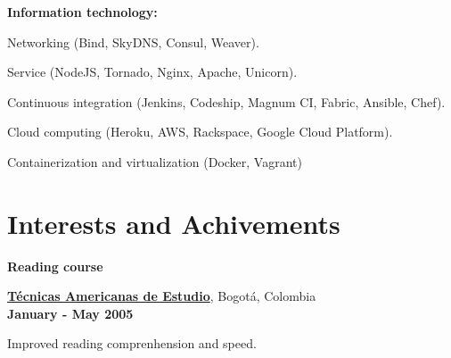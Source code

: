 \halfblankline

\textbf{Information technology:} 
    \begin{innerlist}
\item Networking (Bind, SkyDNS, Consul, Weaver).
\item Service (NodeJS, Tornado, Nginx, Apache, Unicorn).
\item Continuous integration (Jenkins, Codeship, Magnum CI,
Fabric, Ansible, Chef).
\item Cloud computing (Heroku, AWS, Rackspace, Google Cloud Platform).
\item Containerization and virtualization (Docker, Vagrant)
    \end{innerlist}

% 
% 
% 


%
% 
% 

% 

\section{Interests and Achivements}
%
\textbf{Reading course}
\begin{outerlist}

\item[] \href{http://www.tecnicasamericanas.com/}{\textbf{T\'ecnicas Americanas
de Estudio}}, Bogot\'a, Colombia%
        \\ \textbf{January - May 2005}
\begin{innerlist}
\item Improved reading comprenhension and speed.
\end{innerlist}
\end{outerlist}

